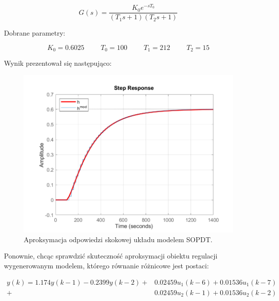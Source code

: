 \begin{equation}
G(s) = \frac{K_0e^{-sT_0}}{(T_1s + 1)(T_2s + 1)}
\end{equation}

\noindent Dobrane parametry:

\begin{equation}
K_0 = \num{0.6025} \hspace{1cm} T_0 = 100 \hspace{1cm} T_1 = 212 \hspace{1cm} T_2 = 15
\end{equation}

\noindent Wynik prezentował się następująco:

\begin{figure}[h!]
\centering
\includegraphics[width=\textwidth]{pictures/model_sopdt}
\caption{Aproksymacja odpowiedzi skokowej układu modelem SOPDT.}
\end{figure}

\newpage

Ponownie, chcąc sprawdzić skuteczność aproksymacji obiektu regulacji wygenerowanym modelem, którego równanie różnicowe jest postaci:

\begin{equation}
\begin{aligned}
y(k) = \num{1.174} y(k-1) - \num{0.2399} y(k-2) + &\num{0.02459} u_1(k-6) + \num{0.01536} u_1(k-7) \\ 
+&\num{0.02459} u_2(k-1) + \num{0.01536} u_2(k-2) 
\end{aligned}
\label{diff_eq}
\end{equation}


